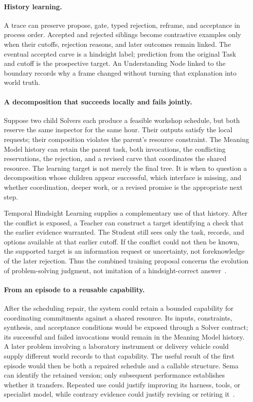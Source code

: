 \documentclass[10pt]{article}
\begin{document}
\paragraph{History learning.}
A trace can preserve propose, gate, typed rejection, reframe, and acceptance in
process order. Accepted and rejected siblings become contrastive examples
only when their cutoffs, rejection reasons, and later outcomes remain linked.
The eventual accepted carve is a hindsight label; prediction from the original
Task and cutoff is the prospective target. An Understanding Node linked to the
boundary records why a frame changed without turning that explanation into
world truth.

\paragraph{A decomposition that succeeds locally and fails jointly.}
Suppose two child Solvers each produce a feasible workshop schedule, but both
reserve the same inspector for the same hour. Their outputs satisfy the local
requests; their composition violates the parent's resource constraint. The
Meaning Model history can retain the parent task, both invocations, the
conflicting reservations, the rejection, and a revised carve that coordinates
the shared resource. The learning target is not merely the final tree. It is
when to question a decomposition whose children appear successful, which
interface is missing, and whether coordination, deeper work, or a revised
promise is the appropriate next step.

Temporal Hindsight Learning supplies a complementary use of that history.
After the conflict is exposed, a Teacher can construct a target identifying a
check that the earlier evidence warranted. The Student still sees only the
task, records, and options available at that earlier cutoff. If the conflict
could not then be known, the supported target is an information request or
uncertainty, not foreknowledge of the later rejection. Thus the combined
training proposal concerns the evolution of problem-solving judgment, not
imitation of a hindsight-correct answer~\cite{westerbergTHL2026}.

\paragraph{From an episode to a reusable capability.}
After the scheduling repair, the system could retain a bounded capability for
coordinating commitments against a shared resource. Its inputs, constraints,
synthesis, and acceptance conditions would be exposed through a Solver
contract; its successful and failed invocations would remain in the Meaning
Model history. A later problem involving a laboratory instrument or delivery
vehicle could supply different world records to that capability. The useful
result of the first episode would then be both a repaired schedule and a
callable structure. Sema can identify the retained version; only subsequent
performance establishes whether it transfers. Repeated use could justify
improving its harness, tools, or specialist model, while contrary evidence
could justify revising or retiring it~\cite{westerbergFractal2026}.
\end{document}
